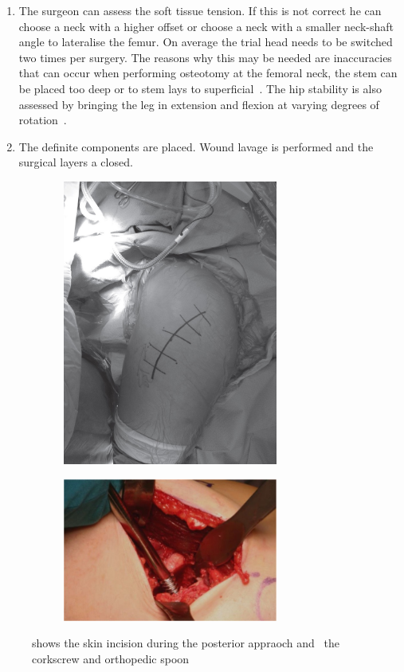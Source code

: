 \documentclass[whitelogo]{tudelft-report}
\begin{document}
{\begin{enumerate}
	\item The surgeon can assess the soft tissue tension. If this is not correct he can choose a neck with a higher offset or choose a neck with a smaller neck-shaft angle to lateralise the femur. On average the trial head needs to be switched two times per surgery. The reasons why this may be needed are inaccuracies that can occur when performing osteotomy at the femoral neck, the stem can be placed too deep or to stem lays to superficial~\cite{blaauw_2018}. The hip stability is also assessed by bringing the leg in extension and flexion at varying degrees of rotation~\cite{camenzind2018direct}. 
	\item The definite components are placed. Wound lavage is performed and the surgical layers a closed. 
\end{enumerate}

\begin{figure}[ht]
	\centering
	\begin{subfigure}[b]{0.5\linewidth}
		\centering\includegraphics[width=200pt]{skinincision.jpg}
		\caption{\label{fig:fig1}}
	\end{subfigure}%
	\begin{subfigure}[b]{0.5\linewidth}
		\centering\includegraphics[width=200pt]{removingfemoralhead.jpg}
		\caption{\label{fig:fig2}}
	\end{subfigure}
	\caption{ shows the skin incision during the posterior appraoch and~ the corkscrew and orthopedic spoon~\cite{camenzind2018direct}~\cite{petis2015surgical}}
\end{figure}

}
\end{document}
